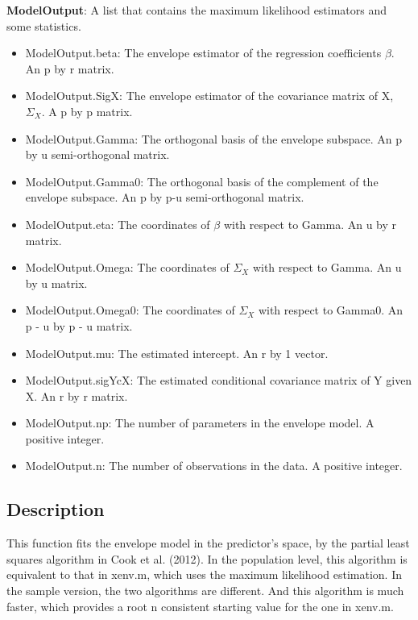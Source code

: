 \documentclass[a4paper,11pt,openany]{memoir}
\begin{document}
\begin{par}
\textbf{ModelOutput}: A list that contains the maximum likelihood estimators and some statistics.
\end{par} \vspace{1em}
\begin{itemize}
\setlength{\itemsep}{-1ex}
   \item ModelOutput.beta: The envelope estimator of the regression coefficients $\beta$. An p by r matrix.
   \item ModelOutput.SigX: The envelope estimator of the covariance matrix of X, $\Sigma_X$.  A p by p matrix.
   \item ModelOutput.Gamma: The orthogonal basis of the envelope subspace. An p by u semi-orthogonal matrix.
   \item ModelOutput.Gamma0: The orthogonal basis of the complement of the envelope subspace.  An p by p-u semi-orthogonal matrix.
   \item ModelOutput.eta: The coordinates of $\beta$ with respect to Gamma. An u by r matrix.
   \item ModelOutput.Omega: The coordinates of $\Sigma_X$ with respect to Gamma. An u by u matrix.
   \item ModelOutput.Omega0: The coordinates of $\Sigma_X$ with respect to Gamma0. An p - u by p - u matrix.
   \item ModelOutput.mu: The estimated intercept.  An r by 1 vector.
   \item ModelOutput.sigYcX: The estimated conditional covariance matrix of Y given X. An r by r matrix.
   \item ModelOutput.np: The number of parameters in the envelope model.  A positive integer.
   \item ModelOutput.n: The number of observations in the data.  A positive integer.
\end{itemize}


\subsection*{Description}

\begin{par}
This function fits the envelope model in the predictor's space, by the partial least squares algorithm in Cook et al. (2012). In the population level, this algorithm is equivalent to that in xenv.m, which uses the maximum likelihood estimation.  In the sample version, the two algorithms are different.  And this algorithm is much faster, which provides a root n consistent starting value for the one in xenv.m.
\end{par} \vspace{1em}
\end{document}
